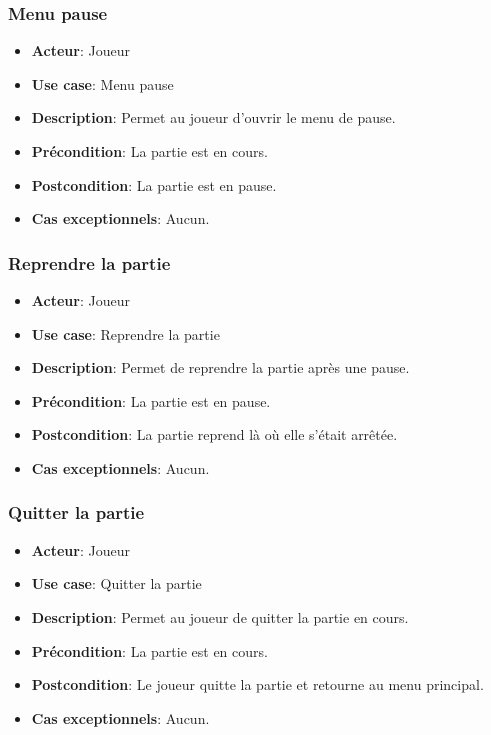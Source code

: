 \documentclass{article}
\begin{document}
\subsubsection{Menu pause}
\begin{itemize}
    \item \textbf{Acteur}: Joueur
    \item \textbf{Use case}: Menu pause
    \item \textbf{Description}: Permet au joueur d'ouvrir le menu de pause.
    \item \textbf{Précondition}: La partie est en cours.
    \item \textbf{Postcondition}: La partie est en pause.
    \item \textbf{Cas exceptionnels}: Aucun.
\end{itemize}

\subsubsection{Reprendre la partie}
\begin{itemize}
    \item \textbf{Acteur}: Joueur
    \item \textbf{Use case}: Reprendre la partie
    \item \textbf{Description}: Permet de reprendre la partie après une pause.
    \item \textbf{Précondition}: La partie est en pause.
    \item \textbf{Postcondition}: La partie reprend là où elle s'était arrêtée.
    \item \textbf{Cas exceptionnels}: Aucun.
\end{itemize}

\subsubsection{Quitter la partie}
\begin{itemize}
    \item \textbf{Acteur}: Joueur
    \item \textbf{Use case}: Quitter la partie
    \item \textbf{Description}: Permet au joueur de quitter la partie en cours.
    \item \textbf{Précondition}: La partie est en cours.
    \item \textbf{Postcondition}: Le joueur quitte la partie et retourne au menu principal.
    \item \textbf{Cas exceptionnels}: Aucun.
\end{itemize}
\end{document}
